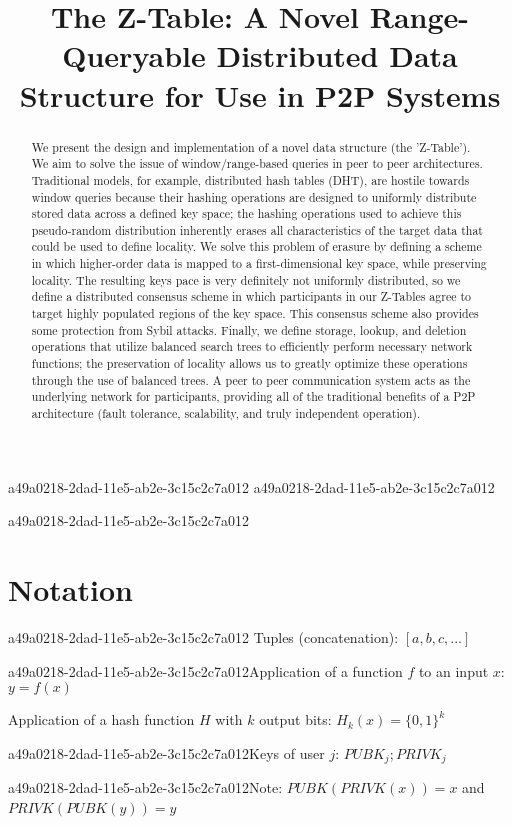 \documentclass[12pt]{article}
\title{The Z-Table: A Novel Range-Queryable Distributed Data Structure for Use in P2P Systems}
\begin{document}
a49a0218-2dad-11e5-ab2e-3c15c2c7a012
a49a0218-2dad-11e5-ab2e-3c15c2c7a012\maketitle

a49a0218-2dad-11e5-ab2e-3c15c2c7a012\begin{abstract}
We present the design and implementation of a novel data structure (the 'Z-Table'). We aim to solve the issue of window/range-based queries in peer to peer architectures. Traditional models, for example,  distributed hash tables (DHT), are hostile towards window queries because their hashing operations are designed to uniformly distribute stored data across a defined key space; the hashing operations used to achieve this pseudo-random distribution inherently erases all characteristics of the target data that could be used to define locality. We solve this problem of erasure by defining a scheme in which higher-order data is mapped to a first-dimensional key space, while preserving locality. The resulting keys pace is very definitely not uniformly distributed, so we define a distributed consensus scheme in which participants in our Z-Tables agree to target highly populated regions of the key space. This consensus scheme also provides some protection from Sybil attacks. Finally, we define storage, lookup, and deletion operations that utilize balanced search trees to efficiently perform necessary network functions; the preservation of locality allows us to greatly optimize these operations through the use of balanced trees. A peer to peer communication system acts as the underlying network for participants, providing all of the traditional benefits of a P2P architecture (fault tolerance, scalability, and truly independent operation).
\end{abstract}

\section{Notation}
a49a0218-2dad-11e5-ab2e-3c15c2c7a012
Tuples (concatenation): $[a,b,c,...]$

a49a0218-2dad-11e5-ab2e-3c15c2c7a012Application of a function $f$ to an input $x$: $y=f(x)$

Application of a hash function $H$ with $k$ output bits: $H_{k}(x) = \{0,1\}^k$

a49a0218-2dad-11e5-ab2e-3c15c2c7a012Keys of user $j$: $ PUBK_j; PRIVK_j $

a49a0218-2dad-11e5-ab2e-3c15c2c7a012Note: $PUBK(PRIVK(x)) = x$ and $PRIVK(PUBK(y)) = y$~
\end{document}
